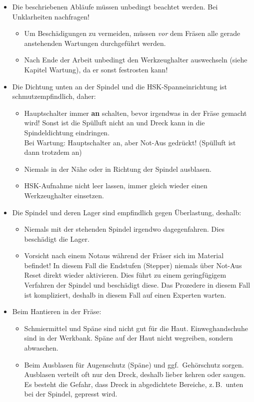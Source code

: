 \documentclass{\basedir/fablab-document}
\begin{document}
\begin{itemize}
 \item Die beschriebenen Abläufe müssen unbedingt beachtet werden. Bei Unklarheiten nachfragen!
	\begin{itemize}
	\item Um Beschädigungen zu vermeiden, müssen \emph{vor} dem Fräsen alle gerade anstehenden Wartungen durchgeführt werden.
	\item Nach Ende der Arbeit unbedingt den Werkzeughalter auswechseln (siehe Kapitel Wartung), da er sonst festrosten kann!
	\end{itemize}
 \item Die Dichtung unten an der Spindel und die HSK-Spanneinrichtung ist schmutzempfindlich, daher:
 \begin{itemize}
  \item Hauptschalter immer \textbf{an} schalten, bevor irgendwas in der Fräse gemacht wird! Sonst ist die Spülluft nicht an und Dreck kann in die Spindeldichtung eindringen.\\Bei Wartung: Hauptschalter an, aber Not-Aus gedrückt! (Spülluft ist dann trotzdem an)
  \item Niemals in der Nähe oder in Richtung der Spindel ausblasen.
  \item HSK-Aufnahme nicht leer lassen, immer gleich wieder einen Werkzeughalter einsetzen.
 \end{itemize}
\item Die Spindel und deren Lager sind empfindlich gegen Überlastung, deshalb: 
 \begin{itemize}
  \item Niemals mit der stehenden Spindel irgendwo dagegenfahren. Dies beschädigt die Lager.
  \item Vorsicht nach einem Notaus während der Fräser sich im Material befindet! In diesem Fall die Endstufen (Stepper) niemals über Not-Aus Reset direkt wieder aktivieren. Dies führt zu einem geringfügigem Verfahren der Spindel und beschädigt diese. Das Prozedere in diesem 
Fall ist kompliziert, deshalb in diesem Fall auf einen Experten warten.
 \end{itemize}
 \item Beim Hantieren in der Fräse:
 \begin{itemize}
  \item Schmiermittel und Späne sind nicht gut für die Haut. Einweghandschuhe sind in der Werkbank. Späne auf der Haut nicht wegreiben, sondern abwaschen.
  \item Beim Ausblasen für Augenschutz (Späne) und ggf.\  Gehörschutz sorgen. Ausblasen verteilt oft nur den Dreck, deshalb lieber kehren oder saugen. Es besteht die Gefahr, dass Dreck in abgedichtete Bereiche, z.\,B.\  unten bei der Spindel, gepresst wird.

\end{itemize}
\end{itemize}
\end{document}
